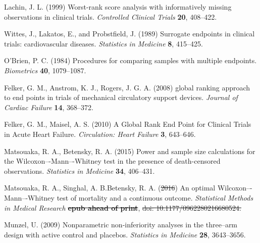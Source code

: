 \documentclass[bimj,fleqn]{w-art}\usepackage[]{graphicx}\usepackage[]{color}
\theoremstyle{plain}
\theoremstyle{definition}
\providecommand{\DIFadd}[1]{{\protect\color{blue}\uwave{#1}}} %
\providecommand{\DIFdel}[1]{{\protect\color{red}\sout{#1}}}                      %
\providecommand{\DIFaddbegin}{} %
\providecommand{\DIFaddend}{} %
\providecommand{\DIFdelbegin}{} %
\providecommand{\DIFdelend}{} %
\newcommand{\DIFscaledelfig}{0.5}
\newlength{\DIFdelgraphicswidth} %
\newlength{\DIFdelgraphicsheight} %
\newcommand{\DIFaddincludegraphics}[2][]{{\color{blue}\fbox{\DIFOincludegraphics[#1]{#2}}}} %
\newcommand{\DIFdelincludegraphics}[2][]{%
\sbox{\DIFdelgraphicsbox}{\DIFOincludegraphics[#1]{#2}}%
\settoboxwidth{\DIFdelgraphicswidth}{\DIFdelgraphicsbox} %
\settoboxtotalheight{\DIFdelgraphicsheight}{\DIFdelgraphicsbox} %
\scalebox{\DIFscaledelfig}{%
\parbox[b]{\DIFdelgraphicswidth}{\usebox{\DIFdelgraphicsbox}\\[-\baselineskip] \rule{\DIFdelgraphicswidth}{0em}}\llap{\resizebox{\DIFdelgraphicswidth}{\DIFdelgraphicsheight}{%
\setlength{\unitlength}{\DIFdelgraphicswidth}%
\begin{picture}(1,1)%
\thicklines\linethickness{2pt} %
{\color[rgb]{1,0,0}\put(0,0){\framebox(1,1){}}}%
{\color[rgb]{1,0,0}\put(0,0){\line( 1,1){1}}}%
{\color[rgb]{1,0,0}\put(0,1){\line(1,-1){1}}}%
\end{picture}%
}\hspace*{3pt}}} %
} %
\DeclareRobustCommand{\DIFaddbegin}{\DIFOaddbegin \let\includegraphics\DIFaddincludegraphics} %
\DeclareRobustCommand{\DIFaddend}{\DIFOaddend \let\includegraphics\DIFOincludegraphics} %
\DeclareRobustCommand{\DIFdelbegin}{\DIFOdelbegin \let\includegraphics\DIFdelincludegraphics} %
\DeclareRobustCommand{\DIFdelend}{\DIFOaddend \let\includegraphics\DIFOincludegraphics} %
\begin{document}
\begin{thebibliography}{10}

 Lachin, J. L. (1999) Worst-rank score
analysis with informatively missing observations in clinical trials.
\textit{Controlled Clinical Trials} \textbf{20}, 408--422.

Wittes, J., Lakatos, E., and Probstfield, J. (1989) Surrogate endpoints in
clinical trials: cardiovascular diseases. \textit{Statistics in Medicine}
\textbf{8}, 415--425.

 O'Brien, P. C. (1984) Procedures
for comparing samples with multiple endpoints. \textit{Biometrics}
\textbf{40}, 1079--1087.

Felker, G. M., Anstrom, K. J., Rogers, J. G. A. (2008) global ranking approach
to end points in trials of mechanical circulatory support devices.
\textit{Journal of Cardiac Failure} \textbf{14}, 368--372.

 Felker, G. M.,
Maisel, A. S. (2010) A Global Rank End Point for Clinical Trials in Acute Heart
Failure. \textit{Circulation: Heart Failure} \textbf{3}, 643--646.

Matsouaka, R. A., Betensky, R. A. (2015) Power and sample size calculations for
the Wilcoxon–-Mann–-Whitney test in the presence of death-censored observations.
\textit{Statistics in Medicine} \textbf{34}, 406--431.

\DIFdelbegin %
\DIFdelend \DIFaddbegin {}
\DIFaddend Matsouaka, R. A., Singhal, A. B.Betensky, R. A. (\DIFdelbegin \DIFdel{2016}\DIFdelend \DIFaddbegin \DIFadd{2018}\DIFaddend ) An optimal
Wilcoxon–-Mann–-Whitney test of mortality and a continuous outcome.
\textit{Statistical Methods in Medical Research} \DIFaddbegin \DIFadd{2018 }\DIFaddend \textbf{\DIFdelbegin \DIFdel{epub ahead of print}\DIFdelend \DIFaddbegin \DIFadd{27(8)}\DIFaddend }, \DIFdelbegin \DIFdel{doi: 10.1177/0962280216680524.
}\DIFdelend \DIFaddbegin \DIFadd{2384–-2400
}\DIFaddend 

Munzel, U. (2009) Nonparametric non‐inferiority analyses in the three--arm design
with active control and placebos.
\textit{Statistics in Medicine} \textbf{28}, 3643--3656.


\end{thebibliography}
\end{document}
